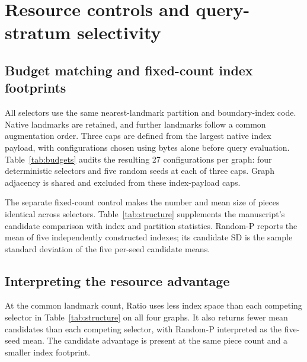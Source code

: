 \section{Resource controls and query-stratum selectivity}
\label{sec:structure}
\subsection{Budget matching and fixed-count index footprints}
All selectors use the same nearest-landmark partition and boundary-index code. Native landmarks are retained, and further landmarks follow a common augmentation order. Three caps are defined from the largest native index payload, with configurations chosen using bytes alone before query evaluation. Table~\ref{tab:budgets} audits the resulting 27 configurations per graph: four deterministic selectors and five random seeds at each of three caps. Graph adjacency is shared and excluded from these index-payload caps.

\begin{table}[H]
\centering\smalltablefont\setlength{\tabcolsep}{4pt}
\caption{Index caps and actual utilization across all matched-budget configurations. MiB means $2^{20}$ bytes. The query counts belong to the original candidate-selectivity cohort.}
\label{tab:budgets}

\end{table}

The separate fixed-count control makes the number and mean size of pieces identical across selectors. Table~\ref{tab:structure} supplements the manuscript's candidate comparison with index and partition statistics. Random-P reports the mean of five independently constructed indexes; its candidate SD is the sample standard deviation of the five per-seed candidate means.

\begin{table}[H]
\centering\smalltablefont\setlength{\tabcolsep}{6pt}
\caption{Fixed-count index and partition statistics. Piece P99 and largest-piece size count vertices. For Random-P, each displayed statistic, including the maximum, is averaged over the five seed-specific values. Candidates are averaged over the 6,800 queries.}
\label{tab:structure}

\end{table}

\clearpage
\subsection{Interpreting the resource advantage}
At the common landmark count, Ratio uses less index space than each competing selector in Table~\ref{tab:structure} on all four graphs. It also returns fewer mean candidates than each competing selector, with Random-P interpreted as the five-seed mean. The candidate advantage is present at the same piece count and a smaller index footprint.

